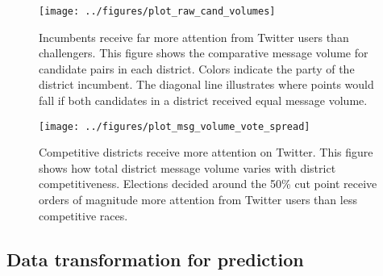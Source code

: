 \documentclass{acm_proc_article-sp}
\begin{document}

\begin{figure}[ht]
  \centering
  \texttt{[image: ../figures/plot\_raw\_cand\_volumes]}
  \caption{Incumbents receive far more attention from Twitter users
    than challengers. This figure shows the comparative message volume for
    candidate pairs in each district. Colors indicate the party of the
    district incumbent. The diagonal line illustrates where points would fall if both candidates in a district received equal message volume.}
  \label{fig:cand-msg-volume}
\end{figure}

\begin{figure}[ht]
  \centering
  \texttt{[image: ../figures/plot\_msg\_volume\_vote\_spread]}
  \caption{Competitive districts receive more attention on
    Twitter. This figure shows how total district message volume
    varies with district competitiveness. Elections decided around the
  50\% cut point receive orders of magnitude more attention from
  Twitter users than less competitive races.}
  \label{fig:msg-volume-vote-spread}
\end{figure}



\subsection{Data transformation for prediction}
\label{sec:data-transf-pred}
\end{document}
